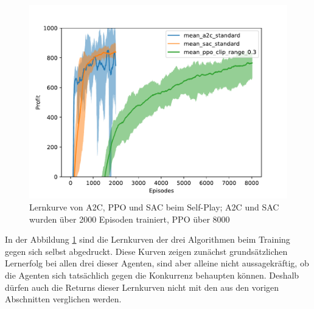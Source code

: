 \begin{figure}[htbp]
	\centering
	\includegraphics[width=\textwidth]{main/self_play.pdf}
	\caption{Lernkurve von A2C, PPO und SAC beim Self-Play; A2C und SAC wurden über 2000 Episoden trainiert, PPO über 8000}
	\label{grafic:SelfPlayLearningCurve}
\end{figure}

In der Abbildung \ref{grafic:SelfPlayLearningCurve} sind die Lernkurven der drei Algorithmen beim Training gegen sich selbst abgedruckt.
Diese Kurven zeigen zunächst grundsätzlichen Lernerfolg bei allen drei dieser Agenten, sind aber alleine nicht aussagekräftig, ob die Agenten sich tatsächlich gegen die Konkurrenz behaupten können.
Deshalb dürfen auch die Returns dieser Lernkurven nicht mit den aus den vorigen Abschnitten verglichen werden.

